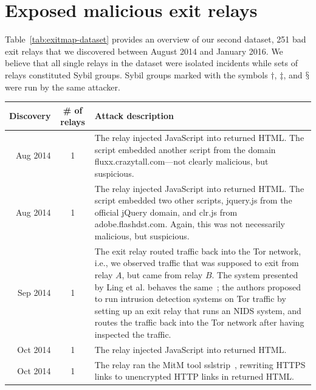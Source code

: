 \appendix

\section{Exposed malicious exit relays}
\label{sec:malicious-relays}
Table~\ref{tab:exitmap-dataset} provides an overview of our second dataset, 251
bad exit relays that we discovered between August 2014 and January 2016.  We
believe that all single relays in the dataset were isolated incidents while sets
of relays constituted Sybil groups.  Sybil groups marked with the symbols
$\dagger$, $\ddagger$, and $\mathsection$ were run by the same attacker.


\begin{table}
\small
\centering
\begin{tabularx}{\textwidth}{r c X}
\hline
\textbf{Discovery} & \textbf{\# of relays} & \textbf{Attack description} \\
\hline
Aug 2014 & 1 & The relay injected JavaScript into returned HTML.  The script
embedded another script from the domain fluxx.crazytall.com---not clearly
malicious, but suspicious. \\

Aug 2014 & 1 & The relay injected JavaScript into returned HTML.  The script
embedded two other scripts, jquery.js from the official jQuery domain, and
clr.js from adobe.flashdst.com.  Again, this was not necessarily malicious, but
suspicious. \\

Sep 2014 & 1 & The exit relay routed traffic back into the Tor network, i.e., we
observed traffic that was supposed to exit from relay $A$, but came from relay
$B$.  The system presented by Ling et al. behaves the same~\cite{Ling2015a};
the authors proposed to run intrusion detection systems on Tor traffic by
setting up an exit relay that runs an NIDS system, and routes the traffic back
into the Tor network after having inspected the traffic. \\

Oct 2014 & 1 & The relay injected JavaScript into returned HTML. \\

Oct 2014 & 1 & The relay ran the MitM tool sslstrip~\cite{sslstrip}, rewriting
HTTPS links to unencrypted HTTP links in returned HTML. \\


\end{tabularx}
\end{table}
